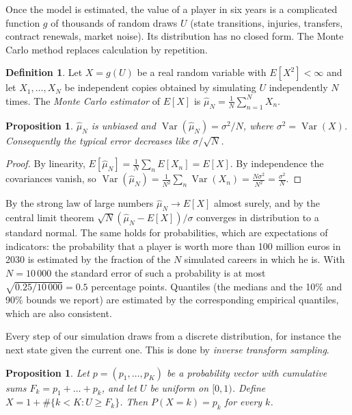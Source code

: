 \documentclass[11pt]{amsart}
\newtheorem{proposition}[theorem]{Proposition}
\theoremstyle{definition}
\newtheorem{definition}[theorem]{Definition}
\theoremstyle{remark}
\begin{document}
Once the model is estimated, the value of a player in six years is a complicated function $g$ of thousands of random draws $U$ (state transitions, injuries, transfers, contract renewals, market noise). Its distribution has no closed form. The Monte Carlo method replaces calculation by repetition.

\begin{definition}
Let $X=g(U)$ be a real random variable with $E[X^2]<\infty$ and let $X_1,\dots,X_N$ be independent copies obtained by simulating $U$ independently $N$ times. The \emph{Monte Carlo estimator} of $E[X]$ is $\hat\mu_N=\frac1N\sum_{n=1}^N X_n$.
\end{definition}

\begin{proposition}\label{prop:mc}
$\hat\mu_N$ is unbiased and $\operatorname{Var}(\hat\mu_N)=\sigma^2/N$, where $\sigma^2=\operatorname{Var}(X)$. Consequently the typical error decreases like $\sigma/\sqrt N$.
\end{proposition}

\begin{proof}
By linearity, $E[\hat\mu_N]=\frac1N\sum_n E[X_n]=E[X]$. By independence the covariances vanish, so
$\operatorname{Var}(\hat\mu_N)=\frac{1}{N^2}\sum_n\operatorname{Var}(X_n)=\frac{N\sigma^2}{N^2}=\frac{\sigma^2}{N}$.
\end{proof}

By the strong law of large numbers $\hat\mu_N\to E[X]$ almost surely, and by the central limit theorem $\sqrt N(\hat\mu_N-E[X])/\sigma$ converges in distribution to a standard normal. The same holds for probabilities, which are expectations of indicators: the probability that a player is worth more than 100 million euros in 2030 is estimated by the fraction of the $N$ simulated careers in which he is. With $N=10\,000$ the standard error of such a probability is at most $\sqrt{0.25/10\,000}=0.5$ percentage points. Quantiles (the medians and the 10\% and 90\% bounds we report) are estimated by the corresponding empirical quantiles, which are also consistent.

Every step of our simulation draws from a discrete distribution, for instance the next state given the current one. This is done by \emph{inverse transform sampling}.

\begin{proposition}\label{prop:inverse}
Let $p=(p_1,\dots,p_K)$ be a probability vector with cumulative sums $F_k=p_1+\dots+p_k$, and let $U$ be uniform on $[0,1)$. Define $X=1+\#\{k<K: U\ge F_k\}$. Then $P(X=k)=p_k$ for every $k$.
\end{proposition}
\end{document}
